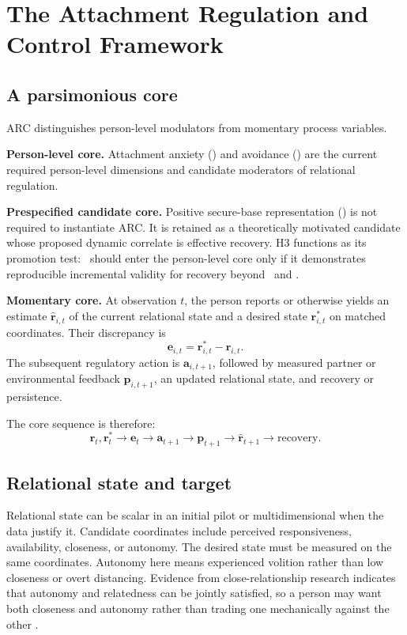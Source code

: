 \section{The Attachment Regulation and Control Framework}

\subsection{A parsimonious core}

ARC distinguishes person-level modulators from momentary process variables.

\textbf{Person-level core.} Attachment anxiety (\Anx) and avoidance (\Avo) are the current required person-level dimensions and candidate moderators of relational regulation.

\textbf{Prespecified candidate core.} Positive secure-base representation (\Sec) is not required to instantiate ARC. It is retained as a theoretically motivated candidate whose proposed dynamic correlate is effective recovery. H3 functions as its promotion test: \Sec\ should enter the person-level core only if it demonstrates reproducible incremental validity for recovery beyond \Anx\ and \Avo.



\textbf{Momentary core.} At observation \(t\), the person reports or otherwise yields an estimate \(\hat{\mathbf r}_{i,t}\) of the current relational state and a desired state \(\mathbf r^\ast_{i,t}\) on matched coordinates. Their discrepancy is
\begin{equation}
\mathbf e_{i,t}=\mathbf r^\ast_{i,t}-\hat{\mathbf r}_{i,t}.
\label{eq:core-discrepancy}
\end{equation}
The subsequent regulatory action is \(\mathbf a_{i,t+1}\), followed by measured partner or environmental feedback \(\mathbf p_{i,t+1}\), an updated relational state, and recovery or persistence.

The core sequence is therefore:
\[
\hat{\mathbf r}_{t},\mathbf r^\ast_t
\rightarrow
\mathbf e_t
\rightarrow
\mathbf a_{t+1}
\rightarrow
\mathbf p_{t+1}
\rightarrow
\hat{\mathbf r}_{t+1}
\rightarrow
\mathrm{recovery}.
\]

\subsection{Relational state and target}

Relational state can be scalar in an initial pilot or multidimensional when the data justify it. Candidate coordinates include perceived responsiveness, availability, closeness, or autonomy. The desired state must be measured on the same coordinates. Autonomy here means experienced volition rather than low closeness or overt distancing. Evidence from close-relationship research indicates that autonomy and relatedness can be jointly satisfied, so a person may want both closeness and autonomy rather than trading one mechanically against the other \parencite{kluwer2020autonomy}.

